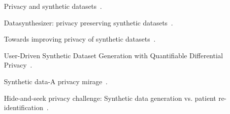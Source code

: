 Privacy and synthetic datasets~\cite{bellovin2019privacy}.

Datasynthesizer: privacy preserving synthetic datasets~\cite{ping2017datasynthesizer}.

Towards improving privacy of synthetic datasets~\cite{kuppa2021towards}.

User-Driven Synthetic Dataset Generation with Quantifiable Differential Privacy~\cite{tai2023user}.

Synthetic data-A privacy mirage~\cite{stadler2020synthetic}.

  Hide-and-seek privacy challenge: Synthetic data generation vs. patient re-identification~\cite{jordon2021hide}.
